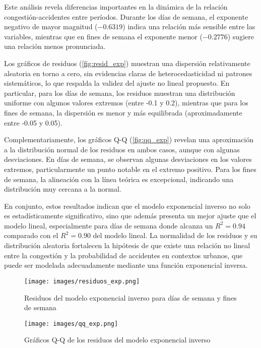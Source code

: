 \documentclass[12pt]{article}
\begin{document}
Este análisis revela diferencias importantes en la dinámica de la relación congestión-accidentes entre períodos. Durante los días de semana, el exponente negativo de mayor magnitud ($-0.6319$) indica una relación más sensible entre las variables, mientras que en fines de semana el exponente menor ($-0.2776$) sugiere una relación menos pronunciada.

Los gráficos de residuos (\autoref{fig:resid_exp}) muestran una dispersión relativamente aleatoria en torno a cero, sin evidencias claras de heterocedasticidad ni patrones sistemáticos, lo que respalda la validez del ajuste no lineal propuesto. En particular, para los días de semana, los residuos muestran una distribución uniforme con algunos valores extremos (entre -0.1 y 0.2), mientras que para los fines de semana, la dispersión es menor y más equilibrada (aproximadamente entre -0.05 y 0.05).

Complementariamente, los gráficos Q-Q (\autoref{fig:qq_exp}) revelan una aproximación a la distribución normal de los residuos en ambos casos, aunque con algunas desviaciones. En días de semana, se observan algunas desviaciones en los valores extremos, particularmente un punto notable en el extremo positivo. Para los fines de semana, la alineación con la línea teórica es excepcional, indicando una distribución muy cercana a la normal.

En conjunto, estos resultados indican que el modelo exponencial inverso no solo es estadísticamente significativo, sino que además presenta un mejor ajuste que el modelo lineal, especialmente para días de semana donde alcanza un $R^2 = 0.94$ comparado con el $R^2 = 0.90$ del modelo lineal. La normalidad de los residuos y su distribución aleatoria fortalecen la hipótesis de que existe una relación no lineal entre la congestión y la probabilidad de accidentes en contextos urbanos, que puede ser modelada adecuadamente mediante una función exponencial inversa.


\begin{figure}[H]
\centering
\texttt{[image: images/residuos\_exp.png]}
\caption{Residuos del modelo exponencial inverso para días de semana y fines de semana}
\label{fig:resid_exp}
\end{figure}

\begin{figure}[H]
\centering
\texttt{[image: images/qq\_exp.png]}
\caption{Gráficos Q-Q de los residuos del modelo exponencial inverso}
\label{fig:qq_exp}
\end{figure}
\end{document}
